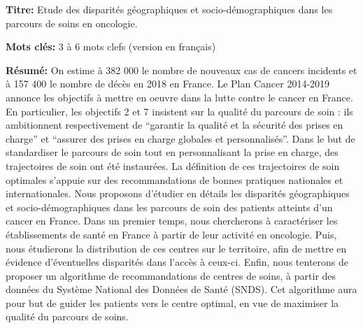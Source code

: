 \begin{mdframed}[linecolor=Prune,linewidth=1]

    \textbf{Titre:} Etude des disparités géographiques et socio-démographiques dans les parcours de soins en oncologie.

    \noindent \textbf{Mots clés:} 3 à 6 mots clefs (version en français)

    \vspace{-.5cm}
    \begin{multicols}{2}
        \noindent \textbf{Résumé:} On estime à 382 000 le nombre de nouveaux cas de
        cancers incidents et à 157 400 le nombre de décès en 2018 en France. Le Plan
        Cancer 2014-2019 annonce les objectifs à mettre en oeuvre dans la lutte contre le
        cancer en France. En particulier, les objectifs 2 et 7 insistent sur la qualité
        du parcours de soin : ils ambitionnent respectivement de ``garantir la qualité
        et la sécurité des prises en charge'' et ``assurer des prises en charge globales
        et personnalisés''. Dans le but de standardiser le parcours de soin tout en
        personnalisant la prise en charge, des trajectoires de soin ont été instaurées.
        La définition de ces trajectoires de soin optimales s'appuie sur des
        recommandations de bonnes pratiques nationales et internationales. Nous
        proposons d'étudier en détails les disparités géographiques et
        socio-démographiques dans les parcours de soin des patients atteints d'un cancer
        en France. Dans un premier temps, nous chercherons à caractériser les
        établissements de santé en France à partir de leur activité en oncologie. Puis,
        nous étudierons la distribution de ces centres sur le territoire, afin de mettre
        en évidence d'éventuelles disparités dans l'accès à ceux-ci. Enfin, nous
        tenterons de proposer un algorithme de recommandations de centres de soins, à
        partir des données du Système National des Données de Santé (SNDS). Cet
        algorithme aura pour but de guider les patients vers le centre optimal, en vue
        de maximiser la qualité du parcours de soins.

    \end{multicols}

\end{mdframed}
